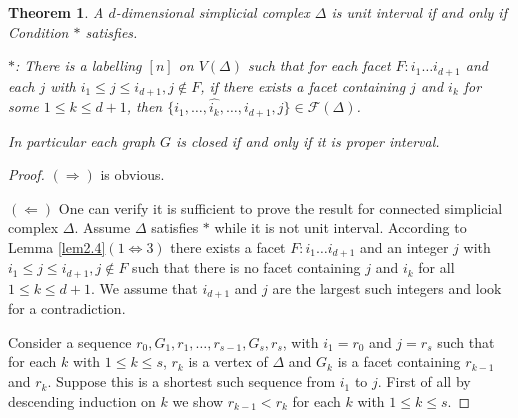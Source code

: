 \documentclass[12pt,reqno]{amsart}
\theoremstyle{plain}
\newtheorem{theorem}{Theorem}[section]
\theoremstyle{definition}
\numberwithin{equation}{section}
\begin{document}
\begin{theorem}\label{Prop}
A $d$-dimensional simplicial complex $\Delta$ is unit interval if and only if  Condition $*$ satisfies. 

$*$: There is a labelling $[n]$ on $V(\Delta)$ such that for each facet $F: i_1\dots i_{d+1}$ and each $j$ with $i_1\leq j\leq i_{d+1}, j\notin F$, if there exists a facet containing $j$ and $i_k$ for some $1\leq k \leq d+1$, then  $\{i_1, \dots,  \widehat{i_k}, \dots, i_{d+1}, j\}\in \mathcal{F}(\Delta )$. 

In particular each graph $G$ is closed if and only if it is proper interval.
\end{theorem}
\begin{proof}
$(\Longrightarrow )$ is obvious.

$(\Longleftarrow )$ One can verify it is sufficient to prove the result for connected simplicial complex $\Delta$. Assume $\Delta $ satisfies $*$ while it is not unit interval. According to Lemma \ref{lem2.4}$(1 \Longleftrightarrow 3)$ there exists a facet $F: i_1 \dots  i_{d+1}$ and an integer $j$ with $i_1\leq j\leq i_{d+1}, j\notin F$ such that there is no facet containing $j$ and $i_k$ for all $1\leq k \leq d+1$. We assume that $i_{d+1}$ and $j$ are the largest such integers and look for a contradiction.

Consider a sequence $ r_0, G_1, r_1, \dots , r_{s-1}, G_s, r_s$, with $i_1=r_0$ and $j=r_s$ such that for each $k$ with $1\leq k \leq s$, $r_k$ is a vertex of $\Delta$ and $G_k$ is a facet containing $r_{k-1}$ and $r_k$. Suppose this is a shortest such sequence from $i_1$ to $j$. First of all by descending induction on $k$ we show $r_{k-1}<r_k$  for each $k$ with $1\leq k \leq s$.


\end{proof}
\end{document}
